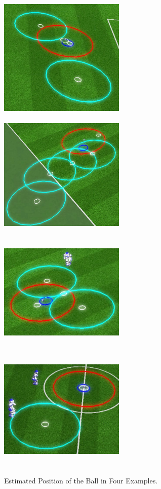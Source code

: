 \begin{figure}[h!]
\centering
  \includegraphics[height=6cm,width=6cm]{Chapter5/figures/BallObs1.png}\	
  \includegraphics[height=6cm,width=6cm]{Chapter5/figures/BallObs2.png}\\
  \includegraphics[height=6cm,width=6cm]{Chapter5/figures/BallObs3.png}\	
  \includegraphics[height=6cm,width=6cm]{Chapter5/figures/BallObs4.png}
  \caption{Estimated Position of the Ball in Four Examples.} 
  \label{fig:AttackingPositioning1}
\end{figure}




